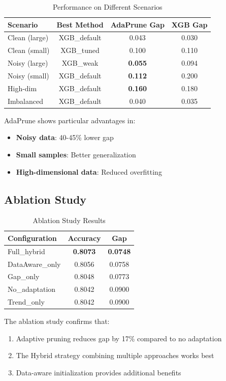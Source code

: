 \documentclass[conference]{IEEEtran}
\begin{document}
\begin{table}[htbp]
\caption{Performance on Different Scenarios}
\label{tab:scenarios}
\centering
\begin{tabular}{lccc}
\toprule
Scenario & Best Method & AdaPrune Gap & XGB Gap \\
\midrule
Clean (large) & XGB\_default & 0.043 & 0.030 \\
Clean (small) & XGB\_tuned & 0.100 & 0.110 \\
Noisy (large) & XGB\_weak & \textbf{0.055} & 0.094 \\
Noisy (small) & XGB\_default & \textbf{0.112} & 0.200 \\
High-dim & XGB\_default & \textbf{0.160} & 0.180 \\
Imbalanced & XGB\_default & 0.040 & 0.035 \\
\bottomrule
\end{tabular}
\end{table}

AdaPrune shows particular advantages in: 
\begin{itemize}
    \item \textbf{Noisy data}: 40-45\% lower gap
    \item \textbf{Small samples}: Better generalization
    \item \textbf{High-dimensional data}: Reduced overfitting
\end{itemize}

\subsection{Ablation Study}

\begin{table}[htbp]
\caption{Ablation Study Results}
\label{tab:ablation}
\centering
\begin{tabular}{lcc}
\toprule
Configuration & Accuracy & Gap \\
\midrule
Full\_hybrid & \textbf{0.8073} & \textbf{0.0748} \\
DataAware\_only & 0.8056 & 0.0758 \\
Gap\_only & 0.8048 & 0.0773 \\
No\_adaptation & 0.8042 & 0.0900 \\
Trend\_only & 0.8042 & 0.0900 \\
\bottomrule
\end{tabular}
\end{table}

The ablation study confirms that: 
\begin{enumerate}
    \item Adaptive pruning reduces gap by 17\% compared to no adaptation
    \item The Hybrid strategy combining multiple approaches works best
    \item Data-aware initialization provides additional benefits
\end{enumerate}
\end{document}
